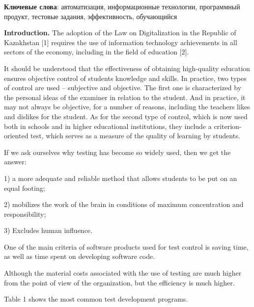 {\bfseries Ключевые слова}: автоматизация, информационные технологии,
программный продукт, тестовые задания, эффективность, обучающийся

\begin{multicols}{2}

{\bfseries Introduction.} The adoption of the Law on Digitalization in the
Republic of Kazakhstan {[}1{]} requires the use of information
technology achievements in all sectors of the economy, including in the
field of education {[}2{]}.

It should be understood that the effectiveness of obtaining high-quality
education ensures objective control of students\textquotesingle{}
knowledge and skills. In practice, two types of control are used --
subjective and objective. The first one is characterized by the personal
ideas of the examiner in relation to the student. And in practice, it
may not always be objective, for a number of reasons, including the
teacher\textquotesingle s likes and dislikes for the student. As for the
second type of control, which is now used both in schools and in higher
educational institutions, they include a criterion-oriented test, which
serves as a measure of the quality of learning by students.

If we ask ourselves why testing has become so widely used, then we get
the answer:

1) a more adequate and reliable method that allows students to be put on
an equal footing;

2) mobilizes the work of the brain in conditions of maximum
concentration and responsibility;

3) Excludes human influence.

One of the main criteria of software products used for test control is
saving time, as well as time spent on developing software code.

Although the material costs associated with the use of testing are much
higher from the point of view of the organization, but the efficiency is
much higher.

Table 1 shows the most common test development programs.
\end{multicols}

